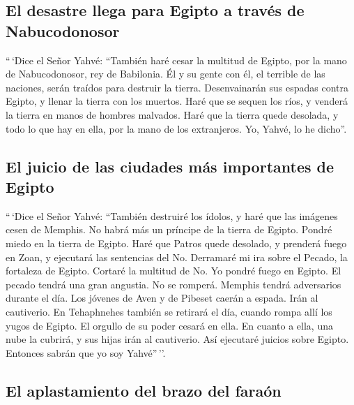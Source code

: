 \begin{paracol}{2}
{\subsection{El desastre llega para Egipto a través de
Nabucodonosor}\label{el-desastre-llega-para-egipto-a-travuxe9s-de-nabucodonosor}}

 ``\,`Dice el Señor Yahvé: ``También haré cesar la
multitud de Egipto, por la mano de Nabucodonosor, rey de Babilonia.
 Él y su gente con él, el terrible de las naciones, serán
traídos para destruir la tierra. Desenvainarán sus espadas contra
Egipto, y llenar la tierra con los muertos.  Haré que se
sequen los ríos, y venderá la tierra en manos de hombres malvados. Haré
que la tierra quede desolada, y todo lo que hay en ella, por la mano de
los extranjeros. Yo, Yahvé, lo he dicho''.

\hypertarget{el-juicio-de-las-ciudades-muxe1s-importantes-de-egipto}{%
\subsection{El juicio de las ciudades más importantes de
Egipto}\label{el-juicio-de-las-ciudades-muxe1s-importantes-de-egipto}}

 ``\,`Dice el Señor Yahvé: ``También destruiré los
ídolos, y haré que las imágenes cesen de Memphis. No habrá más un
príncipe de la tierra de Egipto. Pondré miedo en la tierra de Egipto.
 Haré que Patros quede desolado, y prenderá fuego en
Zoan, y ejecutará las sentencias del No.  Derramaré mi
ira sobre el Pecado, la fortaleza de Egipto. Cortaré la multitud de No.
 Yo pondré fuego en Egipto. El pecado tendrá una gran
angustia. No se romperá. Memphis tendrá adversarios durante el día.
 Los jóvenes de Aven y de Pibeset caerán a espada. Irán
al cautiverio.  En Tehaphnehes también se retirará el
día, cuando rompa allí los yugos de Egipto. El orgullo de su poder
cesará en ella. En cuanto a ella, una nube la cubrirá, y sus hijas irán
al cautiverio.  Así ejecutaré juicios sobre Egipto.
Entonces sabrán que yo soy Yahvé''\,''.

\hypertarget{el-aplastamiento-del-brazo-del-farauxf3n}{%
\subsection{El aplastamiento del brazo del
faraón}\label{el-aplastamiento-del-brazo-del-farauxf3n}}


\end{paracol}

